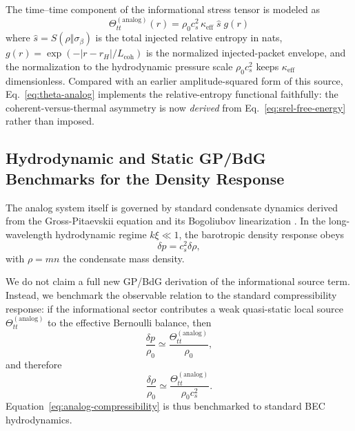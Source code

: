 \documentclass[aps,prd,twocolumn,superscriptaddress,nofootinbib,floatfix]{revtex4-2}
\begin{document}
The time--time component of the informational stress tensor is modeled as
\begin{equation}
    \boxed{\Theta_{tt}^{(\mathrm{analog})}(r) = \rho_0 c_s^2 \,\kappa_{\mathrm{eff}}\; \hat{s}\; g(r)}
    \label{eq:theta-analog}
\end{equation}
where $\hat{s} = S(\rho\Vert\sigma_\beta)$ is the total injected relative entropy in nats, $g(r) = \exp(-|r-r_H|/L_{\mathrm{coh}})$ is the normalized injected-packet envelope, and the normalization to the hydrodynamic pressure scale $\rho_0 c_s^2$ keeps $\kappa_{\mathrm{eff}}$ dimensionless. Compared with an earlier amplitude-squared form of this source, Eq.~\eqref{eq:theta-analog} implements the relative-entropy functional faithfully: the coherent-versus-thermal asymmetry is now \emph{derived} from Eq.~\eqref{eq:srel-free-energy} rather than imposed.

\subsection{Hydrodynamic and Static GP/BdG Benchmarks for the Density Response}

The analog system itself is governed by standard condensate dynamics derived from the Gross-Pitaevskii equation and its Bogoliubov linearization \cite{Barcelo2005,Bloch2008}. In the long-wavelength hydrodynamic regime $k\xi \ll 1$, the barotropic density response obeys
\begin{equation}
    \delta p = c_s^2 \delta \rho,
    \label{eq:bec-compressibility}
\end{equation}
with $\rho = m n$ the condensate mass density.

We do not claim a full new GP/BdG derivation of the informational source term. Instead, we benchmark the observable relation to the standard compressibility response: if the informational sector contributes a weak quasi-static local source $\Theta_{tt}^{(\mathrm{analog})}$ to the effective Bernoulli balance, then
\begin{equation}
    \frac{\delta p}{\rho_0} \simeq \frac{\Theta_{tt}^{(\mathrm{analog})}}{\rho_0},
\end{equation}
and therefore
\begin{equation}
    \frac{\delta \rho}{\rho_0} \simeq \frac{\Theta_{tt}^{(\mathrm{analog})}}{\rho_0 c_s^2}.
    \label{eq:analog-compressibility}
\end{equation}
Equation~\eqref{eq:analog-compressibility} is thus benchmarked to standard BEC hydrodynamics.
\end{document}

